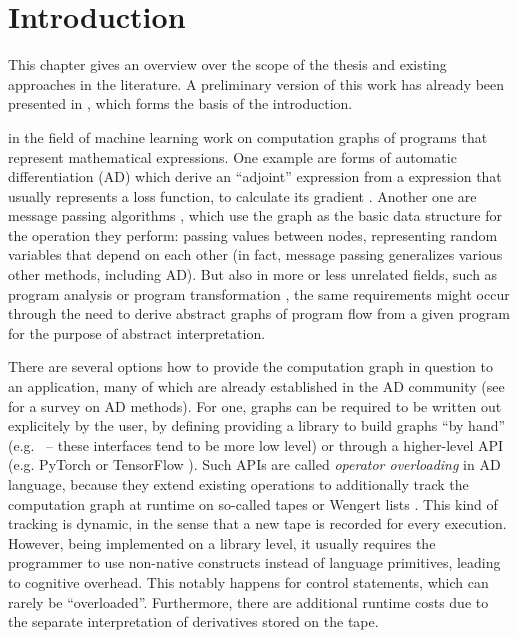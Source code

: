 \chapter{Introduction}
\label{cha:introduction}

This chapter gives an overview over the scope of the thesis and existing approaches in the
literature.  A preliminary version of this work has already been presented in
\textcite{gabler2019graph}, which forms the basis of the introduction.

 in the field of machine learning work on computation graphs of programs
that represent mathematical expressions.  One example are forms of automatic differentiation (AD)
which derive an \enquote{adjoint} expression from a expression that usually represents a loss
function, to calculate its gradient \parencite{griewank2008evaluating, gebremedhin2020introduction}.
Another one are message passing algorithms \parencite{minka2005divergence}, which use the graph as
the basic data structure for the operation they perform: passing values between nodes, representing
random variables that depend on each other (in fact, message passing generalizes various other
methods, including AD).  But also in more or less unrelated fields, such as program analysis or
program transformation \parencite[cf.][]{muchnick1997advanced,singer2018static,aho1986compilers},
the same requirements might occur through the need to derive abstract graphs of program flow from a
given program for the purpose of abstract interpretation.

There are several options how to provide the computation graph in question to an application, many
of which are already established in the AD community (see \textcite{baydin2018automatic} for a
survey on AD methods).  For one, graphs can be required to be written out explicitely by the user,
by defining providing a library to build graphs \enquote{by hand}
(e.g. \textcite{chewxy2020gorgonia,jia2014caffe}~-- these interfaces tend to be more low level) or
through a higher-level API (e.g. PyTorch \parencite{paszke2017automatic} or TensorFlow
\parencite{abadi2015tensorflow}).  Such APIs are called \emph{operator overloading} in AD language,
because they extend existing operations to additionally track the computation graph at runtime on
so-called tapes or Wengert lists \parencite{bartholomew-biggs2000automatic}.  This kind of tracking
is dynamic, in the sense that a new tape is recorded for every execution.  However, being
implemented on a library level, it usually requires the programmer to use non-native constructs
instead of language primitives, leading to cognitive overhead.  This notably happens for control
statements, which can rarely be \enquote{overloaded}.  Furthermore, there are additional runtime
costs due to the separate interpretation of derivatives stored on the tape.


